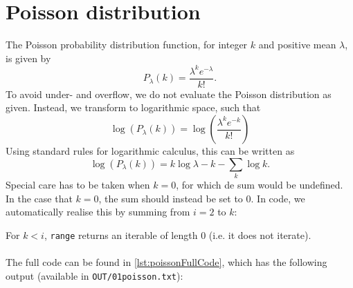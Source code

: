 \section{Poisson distribution}
The Poisson probability distribution function, for integer $k$ and positive mean $\lambda$, is given by
\begin{equation}
	P_\lambda(k) = \frac{\lambda^k e^{-\lambda}}{k!}.
\end{equation}
To avoid under- and overflow, we do not evaluate the Poisson distribution as given. Instead, we transform to logarithmic space, such that
\begin{equation}
	\log\left(P_\lambda(k)\right) = \log\left(\frac{\lambda^k e^{-k}}{k!}\right)
\end{equation}
Using standard rules for logarithmic calculus, this can be written as
\begin{equation}
	\log\left(P_\lambda(k)\right) = k\log{\lambda} - k - \sum_k \log{k}.
\end{equation}
Special care has to be taken when $k=0$, for which de sum would be undefined. In the case that $k=0$, the sum should instead be set to $0$. In code, we automatically realise this by summing from $i=2$ to $k$:

For $k<i$, \verb|range| returns an iterable of length $0$ (i.e. it does not iterate).\\
\\
The full code can be found in \cref{lst:poissonFullCode}, which has the following output (available in \texttt{OUT/01poisson.txt}):



